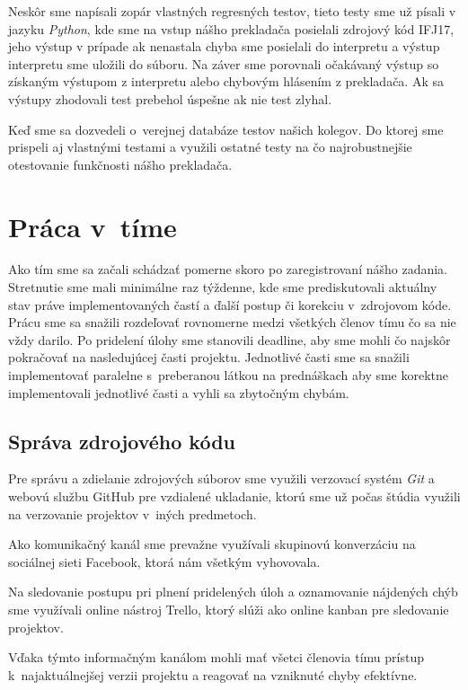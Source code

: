 \documentclass{article}
\begin{document}
    Neskôr sme napísali zopár vlastných regresných testov, tieto testy sme už písali v jazyku \emph{Python}, kde
    sme na vstup nášho prekladača posielali zdrojový kód IFJ17, jeho výstup v prípade ak nenastala chyba sme posielali
    do interpretu a výstup interpretu sme uložili do súboru. Na záver sme porovnali očakávaný výstup so získaným výstupom
    z interpretu alebo chybovým hlásením z prekladača. Ak sa výstupy zhodovali test prebehol úspešne ak nie test zlyhal.
    
    Keď sme sa dozvedeli o~verejnej databáze testov našich kolegov. Do ktorej sme prispeli aj vlastnými testami a využili ostatné testy na čo najrobustnejšie otestovanie funkčnosti nášho prekladača.
    
    \section{Práca v~tíme}
    Ako tím sme sa začali schádzať pomerne skoro po zaregistrovaní nášho zadania. Stretnutie sme mali 
    minimálne raz týždenne, kde sme prediskutovali aktuálny stav práve implementovaných častí 
    a ďalší postup či korekciu v~zdrojovom kóde. Prácu sme sa snažili rozdeľovať rovnomerne medzi 
    všetkých členov tímu čo sa nie vždy darilo. Po pridelení úlohy sme stanovili deadline, aby sme 
    mohli čo najskôr pokračovať na nasledujúcej časti projektu. Jednotlivé časti sme sa snažili 
    implementovať paralelne s~preberanou látkou na prednáškach aby sme korektne implementovali
    jednotlivé časti a vyhli sa zbytočným chybám.

        \subsection{Správa zdrojového kódu}
        Pre správu a zdielanie zdrojových súborov sme využili verzovací systém \emph{Git} a webovú službu GitHub pre vzdialené ukladanie, ktorú sme už 
        počas štúdia využili na verzovanie projektov v~iných predmetoch.
        
        Ako komunikačný kanál sme 
        prevažne využívali skupinovú konverzáciu na sociálnej sieti Facebook, ktorá nám všetkým 
        vyhovovala.
        
        Na sledovanie postupu pri plnení pridelených úloh a oznamovanie nájdených chýb 
        sme využívali online nástroj Trello, ktorý slúži ako online kanban pre sledovanie projektov. 
        
        Vďaka týmto informačným kanálom mohli mať všetci členovia tímu prístup k~najaktuálnejšej
        verzii projektu a reagovať na vzniknuté chyby efektívne.
\end{document}
